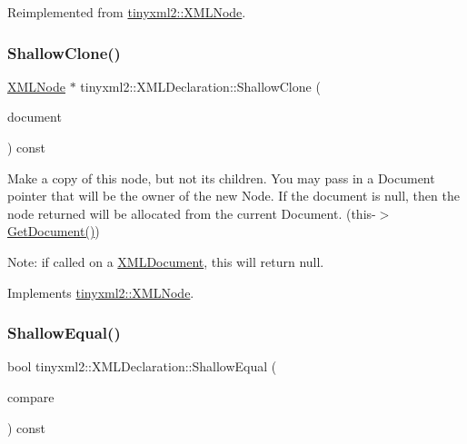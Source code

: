 Reimplemented from \hyperlink{classtinyxml2_1_1_x_m_l_node_a0afc27892998f31735f6225edb40a40d}{tinyxml2\+::\+X\+M\+L\+Node}.

\mbox{\label{classtinyxml2_1_1_x_m_l_declaration_ad9d60e6d2df75c13eb6bf7319985b747}} 
\subsubsection{\texorpdfstring{Shallow\+Clone()}{ShallowClone()}}
{\footnotesize\ttfamily \hyperlink{classtinyxml2_1_1_x_m_l_node}{X\+M\+L\+Node} $\ast$ tinyxml2\+::\+X\+M\+L\+Declaration\+::\+Shallow\+Clone (\begin{DoxyParamCaption}\item[{\hyperlink{classtinyxml2_1_1_x_m_l_document}{X\+M\+L\+Document} $\ast$}]{document }\end{DoxyParamCaption}) const\hspace{0.3cm}{\ttfamily [virtual]}}

Make a copy of this node, but not its children. You may pass in a Document pointer that will be the owner of the new Node. If the \textquotesingle{}document\textquotesingle{} is null, then the node returned will be allocated from the current Document. (this-\/$>$\hyperlink{classtinyxml2_1_1_x_m_l_node_af343d1ef0b45c0020e62d784d7e67a68}{Get\+Document()})

Note\+: if called on a \hyperlink{classtinyxml2_1_1_x_m_l_document}{X\+M\+L\+Document}, this will return null. 

Implements \hyperlink{classtinyxml2_1_1_x_m_l_node_a8402cbd3129d20e9e6024bbcc0531283}{tinyxml2\+::\+X\+M\+L\+Node}.

\mbox{\label{classtinyxml2_1_1_x_m_l_declaration_ae8b4d3a399857029f36c322b0801b69c}} 
\subsubsection{\texorpdfstring{Shallow\+Equal()}{ShallowEqual()}}
{\footnotesize\ttfamily bool tinyxml2\+::\+X\+M\+L\+Declaration\+::\+Shallow\+Equal (\begin{DoxyParamCaption}\item[{const \hyperlink{classtinyxml2_1_1_x_m_l_node}{X\+M\+L\+Node} $\ast$}]{compare }\end{DoxyParamCaption}) const\hspace{0.3cm}{\ttfamily [virtual]}}

